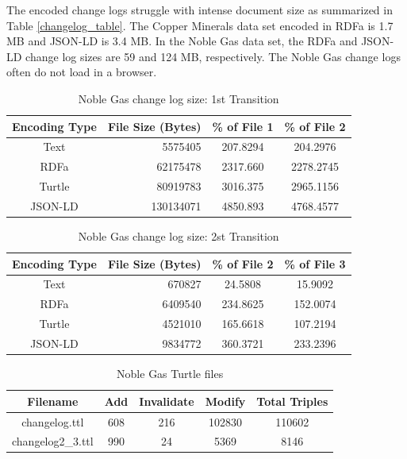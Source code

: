 The encoded change logs struggle with intense document size as summarized in Table \ref{changelog_table}.
The Copper Minerals data set encoded in RDFa is 1.7 MB and JSON-LD is 3.4 MB.
In the Noble Gas data set, the RDFa and JSON-LD change log sizes are 59 and 124 MB, respectively.
The Noble Gas change logs often do not load in a browser.

\begin{table}
	\caption{Noble Gas change log size: 1st Transition}
	\label{table:Ng_changelog_table1}
	\centering
	\begin{tabular}{|c|r|c|c|}
		\hline
		Encoding Type & File Size (Bytes) & \% of File 1 & \% of File 2 \\
		\hline
		Text&	5575405&	207.8294&	204.2976\\
		RDFa&	62175478&	2317.660&	2278.2745\\
		Turtle&	80919783&	3016.375&	2965.1156\\
		JSON-LD&	130134071&	4850.893&	4768.4577\\
		\hline
	\end{tabular}
\end{table}

\begin{table}
	\caption{Noble Gas change log size: 2st Transition}
	\label{table:Ng_changelog_table2}
	\centering
	\begin{tabular}{|c|r|c|c|}
		\hline
		Encoding Type & File Size (Bytes) & \% of File 2 & \% of File 3 \\
		\hline
		Text&	670827&	24.5808&	15.9092\\
		RDFa&	6409540&	234.8625&	152.0074\\
		Turtle&	4521010&	165.6618&	107.2194\\
		JSON-LD&	9834772&	360.3721&	233.2396\\
		\hline
	\end{tabular}
\end{table}

\begin{table}
	\caption{Noble Gas Turtle files}
	\label{table:Ng_turtle}
	\centering
	\begin{tabular}{|c|c|c|c|c|}
		\hline
		Filename&	Add&	Invalidate&	Modify&	Total Triples\\ \hline
		changelog.ttl&	608&	216&	102830&	110602\\
		changelog2\_3.ttl&	990&	24&	5369&	8146\\
		\hline
	\end{tabular}
\end{table}


